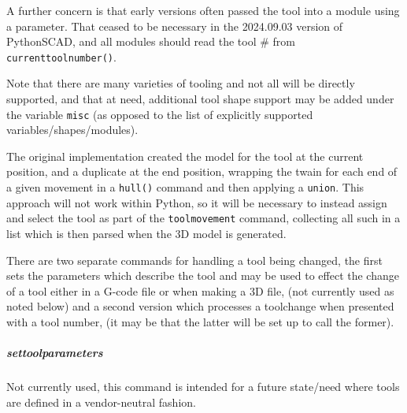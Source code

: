 \documentclass{ltxdoc}
\begin{document}
A further concern is that early versions often passed the tool into a module using a parameter. That ceased to be necessary in the 2024.09.03 version of PythonSCAD, and all modules should read the tool \# from \verb|currenttoolnumber()|. %


Note that there are many varieties of tooling and not all will be directly supported, and that at need, additional tool shape support may be added under the variable \verb|misc| (as opposed to the list of explicitly supported variables/shapes/modules).

The original implementation created the model for the tool at the current position, and a duplicate at the end position, wrapping the twain for each end of a given movement in a \verb|hull()| command and then applying a \verb|union|. This approach will not work within Python, so it will be necessary to instead assign and select the tool as part of the \verb|toolmovement| command, collecting all such in a list which is then parsed when the 3D model is generated.

There are two separate commands for handling a tool being changed, the first sets the parameters which describe the tool and may be used to effect the change of a tool either in a G-code file or when making a \textsc{3D} file,  (not currently used as noted below) and a second version which processes a toolchange when presented with a tool number,  (it may be that the latter will be set up to call the former).

\subparagraph{settoolparameters}

Not currently used, this command is intended for a future state/need where tools are defined in a vendor-neutral fashion.
\end{document}
